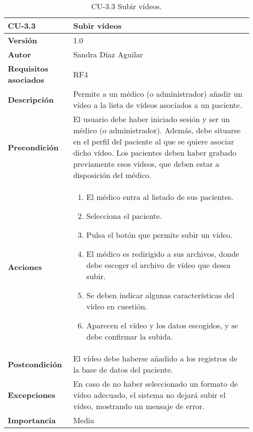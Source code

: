 \begin{table}[p]
	\centering
	\begin{tabularx}{\linewidth}{ p{} p{} }
		\toprule
		\textbf{CU-3.3}    & \textbf{Subir vídeos}\\
		\toprule
		\textbf{Versión}              & 1.0    \\
		\textbf{Autor}                & Sandra Díaz Aguilar \\
		\textbf{Requisitos asociados} & RF4\\
		\textbf{Descripción}          & Permite a un médico (o administrador) añadir un vídeo a la lista de vídeos asociados a un paciente.  \\
		\textbf{Precondición}         & El usuario debe haber iniciado sesión y ser un médico (o administrador). Además, debe situarse en el perfil del paciente al que se quiere asociar dicho vídeo. Los pacientes deben haber grabado previamente esos vídeos, que deben estar a disposición del médico.  \\
		\textbf{Acciones}             &
		\begin{enumerate}
			\def\labelenumi{\arabic{enumi}.}
			\tightlist
			\item El médico entra al listado de sus pacientes. 
			\item Selecciona el paciente. 
            \item Pulsa el botón que permite subir un vídeo. 
            \item El médico es redirigido a sus archivos, donde debe escoger el archivo de vídeo que desea subir. 
            \item Se deben indicar algunas características del vídeo en cuestión.
            \item Aparecen el vídeo y los datos escogidos, y se debe confirmar la subida.  
		\end{enumerate}\\
		\textbf{Postcondición}        & El vídeo debe haberse añadido a los registros de la base de datos del paciente.   \\
		\textbf{Excepciones}          & En caso de no haber seleccionado un formato de vídeo adecuado, el sistema no dejará subir el vídeo, mostrando un mensaje de error.  \\
		\textbf{Importancia}          & Media \\
		\bottomrule
	\end{tabularx}
	\caption{CU-3.3 Subir vídeos.}
\end{table}


